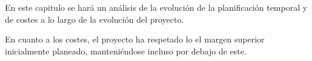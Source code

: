 En este capitulo se hará un análisis de la evolución de la planificación temporal y de costes a lo largo de la evolución del proyecto.

En cuanto a los costes, el proyecto ha respetado lo el margen superior inicialmente planeado, manteniéndose incluso por debajo de este.